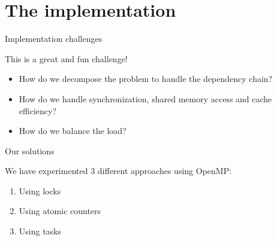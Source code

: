 
\section{The implementation}


   

    \begin{frame}{Implementation challenges}
    \begin{center}
        This is a great and fun challenge!
    \end{center}
        
        \begin{itemize}
            
            \item How do we decompose the problem to handle the dependency chain?
            \item How do we handle synchronization, shared memory access and cache efficiency?
            \item How do we balance the load?
           
        \end{itemize}
    \end{frame}


    

    \begin{frame}{Our solutions}

        We have experimented 3 different approaches using OpenMP:

        \begin{enumerate}
            \item Using locks
            \item Using atomic counters
            \item Using tasks
        \end{enumerate}
        
    \end{frame}



